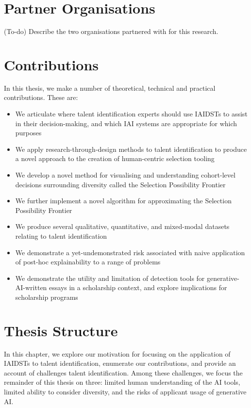 \section{Partner Organisations}
(To-do) Describe the two organisations partnered with for this research.

\section{Contributions}
In this thesis, we make a number of theoretical, technical and practical contributions. These are:

\begin{itemize}
    \item We articulate where talent identification experts should use IAIDSTs to assist in their decision-making, and which IAI systems are appropriate for which purposes
    \item We apply research-through-design methods to talent identification to produce a novel approach to the creation of human-centric selection tooling
    \item We develop a novel method for visualising and understanding cohort-level decisions surrounding diversity called the Selection Possibility Frontier
    \item We further implement a novel algorithm for approximating the Selection Possibility Frontier
    \item We produce several qualitative, quantitative, and mixed-modal datasets relating to talent identification
    \item We demonstrate a yet-undemonstrated risk associated with naive application of post-hoc explainability to a range of problems
    \item We demonstrate the utility and limitation of detection tools for generative-AI-written essays in a scholarship context, and explore implications for scholarship programs
\end{itemize}

\section{Thesis Structure}
In this chapter, we explore our motivation for focusing on the application of IAIDSTs to talent identification, enumerate our contributions, and provide an account of challenges talent identification. Among these challenges, we focus the remainder of this thesis on three: limited human understanding of the AI tools, limited ability to consider diversity, and the risks of applicant usage of generative AI.

